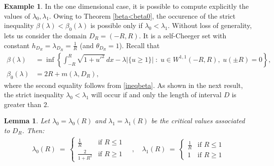 \documentclass[reqno,11pt]{amsart}
\newtheorem{lemma}[theorem]{Lemma}
\theoremstyle{definition}
\newtheorem{example}[theorem]{Example}
\numberwithin{equation}{section}
\newcommand{\1}{{{\bf 1}\kern-0,28em\rm l}}
\def\sepa{\; : \;}
\newcommand{\aco}[1]{\left\{#1\right\}}
\def\l{\lambda}
\begin{document}
\begin{example}\label{ex1D} In the one dimensional case, it is possible to compute explicitly the values of $\l_0,\l_1$. 
Owing to Theorem \ref{beta<beta0}, the occurence of the strict inequality $\beta(\l)<\beta_0(\l)$ is possible only if $\l_0<\l_1$. 
Without loss of generality, lets us consider  the domain  $D_R=(-R,R)$. It is a self-Cheeger set with constant $h_{D_R}=\l_{D_R}= \frac1{R}$
(and $\theta_{D_R}=1$). Recall that 
 \begin{align*}
\beta(\lambda)&= \inf\aco{ \int_{-R}^R \sqrt{1+u'^2}\, dx - \lambda|\{u\ge 1\}| \sepa u\in W^{1,1}(-R,R),\; u(\pm R) = 0},\\
\beta_0(\lambda) &= 2 R + m(\l, D_R) ,
\end{align*}
where the second equality follows from \eqref{ineqbeta}.
As shown in the next result, the strict inequality $\l_0<\l_1$  
 will occur if and only the length of interval $D$ is greater than $2$. 

\begin{lemma}\label{1dcase} Let $\l_0=\l_0(R)$ and $\l_1=\l_1(R)$ be the critical values  associated to  $D_R$. Then:
\begin{align} \label{1dcase-1} \l_0(R)\ =\ \begin{cases} \frac1{R} & \text{if $R\le 1$} \\ \frac2{1+R^2} & \text{if $R\ge 1$} \end{cases}  \quad,\quad
 \l_1(R)\ =\ \begin{cases} \frac1{R} & \text{if $R\le 1$} \\ 1 & \text{if $R\ge 1$} \end{cases}
\end{align}
\end{lemma}


\end{example}
\end{document}

